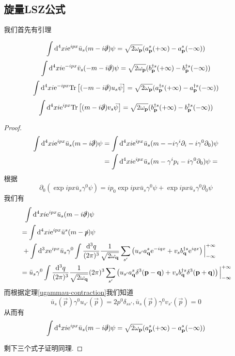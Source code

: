 \subsection{旋量LSZ公式}
我们首先有引理
\begin{lemma}
    \begin{equation}
        \int\mathrm d^4xi\mathrm e^{ipx}\bar u_s(m-i\slashed\partial)\psi=\sqrt{2\omega_{\mathbf{p}}}(a_{\mathbf{p}}^s(+\infty)-a_{\mathbf{p}}^s(-\infty))
    \end{equation}
    \begin{equation}
        \int\mathrm d^4xi\mathrm e^{-ipx}\bar v_s(-m-i\slashed\partial)\psi=\sqrt{2\omega_{\mathbf{p}}}(b_{\mathbf{p}}^{\dagger s}(+\infty)-b_{\mathbf{p}}^{\dagger s}(-\infty))
    \end{equation}
    \begin{equation}
        \int\mathrm d^4xi\mathrm e^{-ipx}\mathrm{Tr}\left[(-m-i\slashed\partial)u_s\bar\psi\right]=\sqrt{2\omega_{\mathbf{p}}}(a_{\mathbf{p}}^{\dagger s}(+\infty)-a_{\mathbf{p}}^{\dagger s}(-\infty))
    \end{equation}
    \begin{equation}
        \int\mathrm d^4xi\mathrm e^{ipx}\mathrm{Tr}\left[(m-i\slashed\partial)v_s\bar\psi\right]=\sqrt{2\omega_{\mathbf{p}}}(b_{\mathbf{p}}^{\dagger s}(+\infty)-b_{\mathbf{p}}^{\dagger s}(-\infty))
    \end{equation}
\end{lemma}
\begin{proof}
    \begin{align}
        \int\mathrm d^4xi\mathrm e^{ipx}\bar u_s(m-i\slashed\partial)\psi&=\int\mathrm d^4xi\mathrm e^{ipx}\bar u_s(m--i\gamma^i\partial_i-i\gamma^0\partial_0)\psi\\
        &=\int\mathrm d^4xi\mathrm e^{ipx}\bar u_s(m-\gamma^ip_i-i\gamma^0\partial_0)\psi=
    \end{align}
    根据
    \begin{equation}
        \partial_0(\exp{ipx}\bar u_s\gamma^0\psi)=ip_0\exp{ipx}\bar u_s\gamma^0\psi+\exp{ipx}\bar u_s\gamma^0\partial_0\psi
    \end{equation}
    我们有
    \begin{align}
        &\;\;\int\d^4xi\exp{ipx}\bar u_s(m-i\slashed\partial)\psi\\
        &=\int\d^4xi\exp{ipx}\bar u^s(m-\slashed p)\psi\notag\\
        &\;+\int\d^3x\exp{ipx}\bar u_s\gamma^0\int\ldsq q{}\sum_{s'}\left(u_{s'}\a q^s\exp{-iqx}+v_s\b q^{\dagger s}\exp{iqx}\right)\Big|_{-\infty}^{+\infty}\\
        &=\bar u_s\gamma^0\int\ldsq q{\dpi3}\sum_{s'}\left(u_{s'}\a q^s\delta^3(\vec p-\vec q)+v_s\b q^{\dagger s}\delta^3(\vec p+\vec q)\right)\Big|_{-\infty}^{+\infty}
    \end{align}
    而根据定理\ref{ugammau-contraction}我们知道
    \begin{equation}
        \bar u_s(\vec p)\gamma^0u_{s'}(\vec p)=2p^0\delta_{ss'}, \bar u_s(\vec p)\gamma^0v_{s'}(\vec p)=0
    \end{equation}
    从而有
    \begin{equation}
        \int\mathrm d^4xi\mathrm e^{ipx}\bar u_s(m-i\slashed\partial)\psi=\sqrt{2\omega_{\mathbf{p}}}(a_{\mathbf{p}}^s(+\infty)-a_{\mathbf{p}}^s(-\infty))
    \end{equation}

    剩下三个式子证明同理.
\end{proof}

